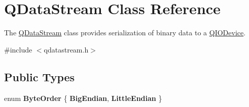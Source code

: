 \hypertarget{class_q_data_stream}{}\section{Q\+Data\+Stream Class Reference}
\label{class_q_data_stream}


The \mbox{\hyperlink{class_q_data_stream}{Q\+Data\+Stream}} class provides serialization of binary data to a \mbox{\hyperlink{class_q_i_o_device}{Q\+I\+O\+Device}}.  




{\ttfamily \#include $<$qdatastream.\+h$>$}

\subsection*{Public Types}
\begin{DoxyCompactItemize}
\item 
\mbox{\label{class_q_data_stream_a0cc872752a2cc23a0cf2bcb359cdf135}} 
enum {\bfseries Byte\+Order} \{ {\bfseries Big\+Endian}, 
{\bfseries Little\+Endian}
 \}
\end{DoxyCompactItemize}
